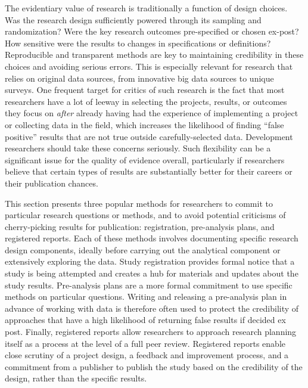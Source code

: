 The evidentiary value of research is traditionally a function of design choices.\cite{angrist2010credibility,ioannidis2005most}
Was the research design sufficiently powered through its sampling and randomization?
Were the key research outcomes pre-specified or chosen ex-post?
How sensitive were the results to changes in specifications or definitions?
Reproducible and transparent methods are key to maintaining credibility
in these choices and avoiding serious errors.\cite{christensen2019transparent}
This is especially relevant for research that relies on original data sources,
from innovative big data sources to unique surveys.
One frequent target for critics of such research\cite{ioannidis2017power}
is the fact that most researchers have a lot of leeway
in selecting the projects, results, or outcomes they focus on
\textit{after} already having had the experience of implementing a project
or collecting data in the field,
which increases the likelihood of finding ``false positive''
results that are not true outside carefully-selected data.
Development researchers should take these concerns seriously.
Such flexibility can be a significant issue for the quality of evidence overall,
particularly if researchers believe that certain types of results
are substantially better for their careers or their publication chances.

This section presents three popular methods
for researchers to commit to particular research questions or methods,
and to avoid potential criticisms of cherry-picking results for publication:
registration, pre-analysis plans, and registered reports.
Each of these methods involves documenting specific research design components,
ideally before carrying out the analytical component or extensively exploring the data.
Study registration provides formal notice that a study is being attempted
and creates a hub for materials and updates about the study results.
Pre-analysis plans are a more formal commitment
to use specific methods on particular questions.
Writing and releasing a pre-analysis plan
in advance of working with data is therefore often used to protect the credibility
of approaches that have a high likelihood of returning false results if decided ex post.
Finally, registered reports allow researchers to approach research planning itself
as a process at the level of a full peer review.
Registered reports enable close scrutiny of a project design,
a feedback and improvement process,
and a commitment from a publisher to publish the study
based on the credibility of the design, rather than the specific results.

